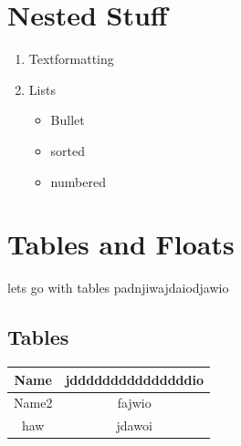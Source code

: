 \documentclass[11pt]{article}
\begin{document}
    \section{Nested Stuff}
    \begin{enumerate}
        \item Textformatting
        \item Lists \begin{itemize}
                        \item Bullet
                        \item sorted
                        \item numbered
        \end{itemize}
    \end{enumerate}


    \section{Tables and Floats}
    lets go with tables \bigskip
    padnjiwajdaiodjawio
    
    \subsection{Tables}
    \vspace{0.5cm}
    \begin{tabular}{|c||c|}
        \hline
        Name  & jdddddddddddddddio \\
        \hline
        Name2 & fajwio             \\
        \hline
        haw   & jdawoi             \\
        \hline
    \end{tabular}
    
\end{document}
